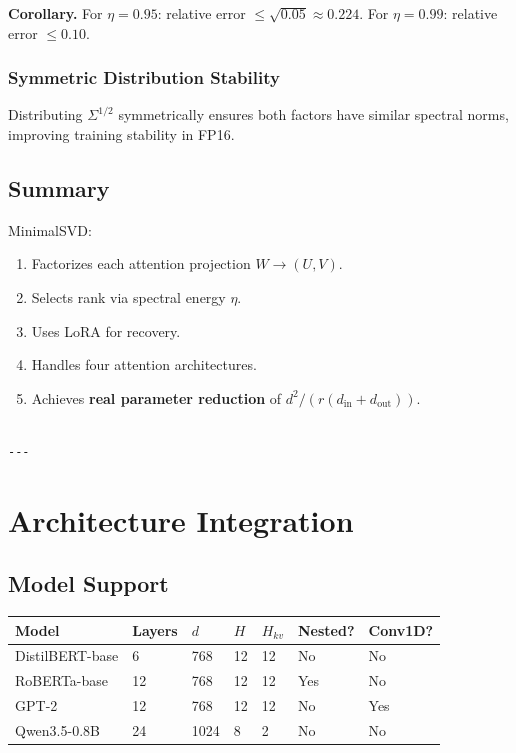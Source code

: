 \textbf{Corollary.} For $\eta = 0.95$: relative error $\leq \sqrt{0.05} \approx 0.224$. 
For $\eta = 0.99$: relative error $\leq 0.10$.

\subsubsection{Symmetric Distribution Stability}

Distributing $\Sigma^{1/2}$ symmetrically ensures both factors have similar 
spectral norms, improving training stability in FP16.

\subsection{Summary}

MinimalSVD:
\begin{enumerate}
\item Factorizes each attention projection $W \to (U, V)$.
\item Selects rank via spectral energy $\eta$.
\item Uses LoRA for recovery.
\item Handles four attention architectures.
\item Achieves \textbf{real parameter reduction} of $d^2 / (r(d_\text{in} + d_\text{out}))$.
\end{enumerate}
\begin{lstlisting}

---
\end{lstlisting}


\section{Architecture Integration}

\subsection{Model Support}

\begin{table}[H]
\centering
\small
\begin{tabular}{lllllll}
\toprule
\textbf{Model} & \textbf{Layers} & \textbf{$d$} & \textbf{$H$} & \textbf{$H_{kv}$} & \textbf{Nested?} & \textbf{Conv1D?} \\
\midrule
DistilBERT-base & 6 & 768 & 12 & 12 & No & No \\
RoBERTa-base & 12 & 768 & 12 & 12 & Yes & No \\
GPT-2 & 12 & 768 & 12 & 12 & No & Yes \\
Qwen3.5-0.8B & 24 & 1024 & 8 & 2 & No & No \\
\bottomrule
\end{tabular}
\end{table}

